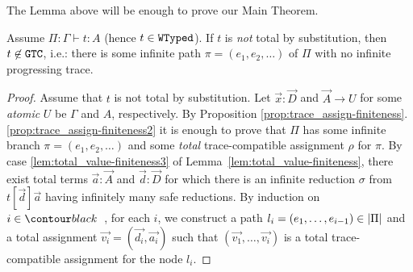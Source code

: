 The Lemma above will be enough to prove our Main Theorem.


\begin{theorem}
\label{theorem-main-finite-safe-reduction}
  Assume $\Pi:\Gamma\vdash t : A$ (hence $t\in {\tt WTyped}$).
  If $t$ is \emph{not} total by substitution, then $t \not \in {\tt GTC}$, i.e.:
  there is some infinite path $\pi = (e_1, e_2, \ldots)$ of $\Pi$ with no infinite progressing trace. 
\end{theorem}



\begin{proof}
  Assume that $t$ is not total by substitution. 
  Let $\vec{x}:\vec{D}$ and $\vec{A}\rightarrow U$ for some \emph{atomic} $U$ 
 be $\Gamma$ and $A$, respectively.
  By Proposition \ref{prop:trace_assign-finiteness}.\ref{prop:trace_assign-finiteness2} it is enough to prove that
  $\Pi$ has some infinite branch $\pi=(e_1, e_2, \ldots)$ 
  and some \emph{total} trace-compatible assignment $\rho$ for $\pi$.
  By case \ref{lem:total_value-finiteness3} of Lemma~\ref{lem:total_value-finiteness},
  there exist total terms $\vec{a}:\vec{A}$ and $\vec{d}:\vec{D}$ for which there is
  an infinite reduction $\sigma$ from $t[\vec{d}]\vec{a}$ having infinitely many safe reductions.
  By induction on $i \in \Nat$, for each $i$, we construct a path 
  $l_i = (e_1,\ldots,e_{i-1}) \in {|\Pi|}$
  and a total assignment $\vec{v_i} = (\vec{d_i},\vec{a_i})$ such that
  $(\vec{v_1},\ldots,\vec{v_i})$ is a total trace-compatible assignment for the node $l_i$. 

  

\end{proof}
